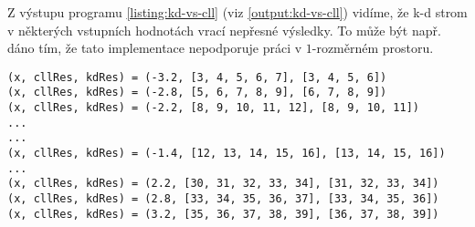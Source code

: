  Z výstupu programu \ref{listing:kd-vs-cll} (viz \ref{output:kd-vs-cll}) vidíme, že k-d strom v některých vstupních hodnotách vrací nepřesné výsledky. To může být např. dáno tím, že tato implementace nepodporuje práci v $1$-rozměrném prostoru.

\begin{lstlisting}[caption={Výstup programu \ref{listing:kd-vs-cll}}, label={output:kd-vs-cll}]
(x, cllRes, kdRes) = (-3.2, [3, 4, 5, 6, 7], [3, 4, 5, 6])
(x, cllRes, kdRes) = (-2.8, [5, 6, 7, 8, 9], [6, 7, 8, 9])
(x, cllRes, kdRes) = (-2.2, [8, 9, 10, 11, 12], [8, 9, 10, 11])
...
...
(x, cllRes, kdRes) = (-1.4, [12, 13, 14, 15, 16], [13, 14, 15, 16])
...
(x, cllRes, kdRes) = (2.2, [30, 31, 32, 33, 34], [31, 32, 33, 34])
(x, cllRes, kdRes) = (2.8, [33, 34, 35, 36, 37], [33, 34, 35, 36])
(x, cllRes, kdRes) = (3.2, [35, 36, 37, 38, 39], [36, 37, 38, 39])
\end{lstlisting}

